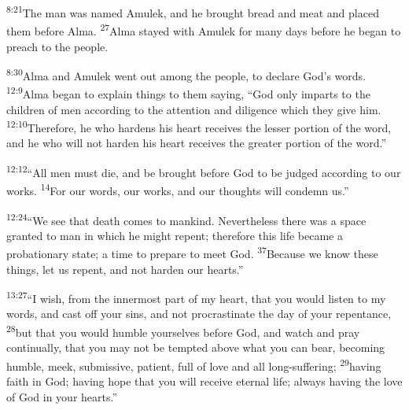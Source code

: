 \documentclass[openany,12pt,english]{book}
\newenvironment{para}{\par\pretolerance=100\tolerance=200\setlength{\emergencystretch}{0.6em}\relax}{\par}
\begin{document}
\begin{para}
    \textsuperscript{8:21}\thinspace{}The man was named Am\-u\-lek, and he brought bread and meat and placed them be\-fore Al\-ma.
    \textsuperscript{27}\thinspace{}Al\-ma stayed with Am\-u\-lek for man\-y days be\-fore he be\-gan to preach to the peo\-ple.
\end{para}

\bigskip{}

\begin{para}
    \textsuperscript{8:30}\thinspace{}Al\-ma and Am\-u\-lek went out a\-mong the peo\-ple, to de\-clare God's words.
    \textsuperscript{12:9}\thinspace{}Al\-ma be\-gan to ex\-plain things to them say\-ing, “God on\-ly imparts to the chil\-dren of men ac\-cord\-ing to the at\-ten\-tion and dil\-i\-gence which they give him.
    \textsuperscript{12:10}\thinspace{}There\-fore, he who hardens his heart receives the less\-er por\-tion of the word, and he who will not hard\-en his heart receives the greater por\-tion of the word.”
\end{para}

\begin{para}
    \textsuperscript{12:12}\thinspace{}“All men must die, and be brought be\-fore God to be judged ac\-cord\-ing to our works.
    \textsuperscript{14}\thinspace{}For our words, our works, and our thoughts will con\-demn us.”
\end{para}

\begin{para}
    \textsuperscript{12:24}\thinspace{}“We see that death co\-mes to man\-kind. Nev\-er\-the\-less there was a space grant\-ed to man in which he might re\-pent; there\-fore this life be\-came a probationary state; a time to pre\-pare to meet God.
    \textsuperscript{37}\thinspace{}Be\-cause we know these things, let us re\-pent, and not hard\-en our hearts.”
\end{para}

\begin{para}
    \textsuperscript{13:27}\thinspace{}“I wish, from the in\-ner\-most part of my heart, that you would lis\-ten to my words, and cast off your sins, and not pro\-cras\-ti\-nate the day of your re\-pent\-ance,
    \textsuperscript{28}\thinspace{}but that you would hum\-ble your\-selves be\-fore God, and watch and pray con\-tin\-u\-al\-ly, that you may not be tempted a\-bove what you can bear, be\-com\-ing hum\-ble, meek, sub\-mis\-sive, pa\-tient, full of love and all long-suffering;
    \textsuperscript{29}\thinspace{}hav\-ing faith in God; hav\-ing hope that you will re\-ceive e\-ter\-nal life; al\-ways hav\-ing the love of God in your hearts.”
\end{para}
\end{document}
